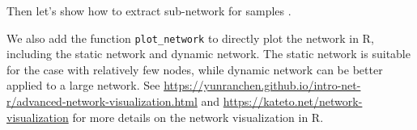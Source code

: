\documentclass[
]{book}
\newenvironment{Shaded}{\begin{snugshade}}{\end{snugshade}}
\newcommand{\AttributeTok}[1]{\textcolor[rgb]{0.77,0.63,0.00}{#1}}
\newcommand{\CommentTok}[1]{\textcolor[rgb]{0.56,0.35,0.01}{\textit{#1}}}
\newcommand{\ConstantTok}[1]{\textcolor[rgb]{0.00,0.00,0.00}{#1}}
\newcommand{\DecValTok}[1]{\textcolor[rgb]{0.00,0.00,0.81}{#1}}
\newcommand{\FunctionTok}[1]{\textcolor[rgb]{0.00,0.00,0.00}{#1}}
\newcommand{\NormalTok}[1]{#1}
\newcommand{\OtherTok}[1]{\textcolor[rgb]{0.56,0.35,0.01}{#1}}
\newcommand{\SpecialCharTok}[1]{\textcolor[rgb]{0.00,0.00,0.00}{#1}}
\newcommand{\StringTok}[1]{\textcolor[rgb]{0.31,0.60,0.02}{#1}}
\begin{document}
Then let's show how to extract sub-network for samples \citep{Ma_Geographic_2016}.

\begin{Shaded}
\end{Shaded}

We also add the function \texttt{plot\_network} to directly plot the network in R, including the static network and dynamic network.
The static network is suitable for the case with relatively few nodes, while dynamic network can be better applied to a large network.
See \url{https://yunranchen.github.io/intro-net-r/advanced-network-visualization.html} and \url{https://kateto.net/network-visualization} for more
details on the network visualization in R.
\end{document}
